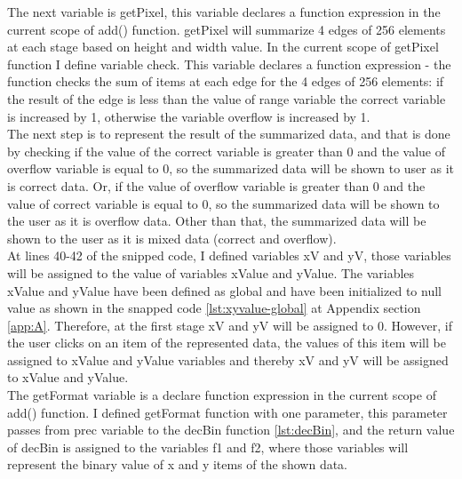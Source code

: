 \documentclass[11pt]{article}
\begin{document}
The next variable is getPixel, this variable declares a function expression in the current scope of add() function. getPixel will summarize 4 edges of 256 elements at each stage based on height and width value. In the current scope of getPixel function I define variable check. This variable declares a function expression - the function checks the sum of items at each edge for the 4 edges of 256 elements: if the result of the edge is less than the value of range variable the correct variable is increased by 1,  otherwise the variable overflow is increased by 1.\\

The next step is to represent the result of the summarized data, and that is done by checking if the value of the correct variable is greater than 0 and the value of overflow variable is equal to 0, so the summarized data will be shown to user as it is correct data. Or, if the value of overflow variable is greater than 0 and the value of correct variable is equal to 0, so the summarized data will be shown to the user as it is overflow data. Other than that, the summarized data will be shown to the user as it is mixed data (correct and overflow).\\

At lines 40-42 of the snipped code, I defined variables xV and yV, those variables will be assigned to the value of variables xValue and yValue. The variables xValue and yValue have been defined as global and have been initialized to null value as shown in the snapped code \ref{lst:xyvalue-global} at Appendix section \ref{app:A}. Therefore, at the first stage xV and yV will be assigned to 0. However, if the user clicks on an item of the represented data, the values of this item will be assigned to xValue and yValue variables and thereby xV and yV will be assigned to xValue and yValue.\\

The getFormat variable is a declare function expression in the current scope of add() function. I defined getFormat function with one parameter, this parameter passes from prec variable to the decBin function \ref{lst:decBin}, and the return value of decBin is assigned to the variables f1 and f2, where those variables will represent the binary value of x and y items of the shown data.\\
\end{document}
